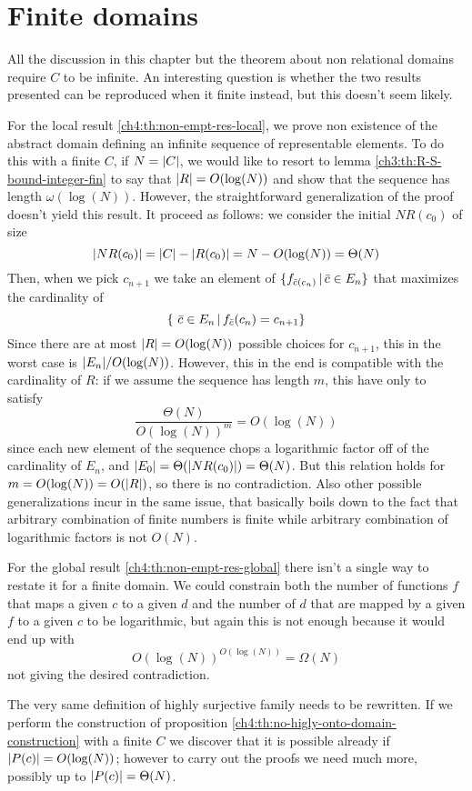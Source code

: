 \section{Finite domains}
All the discussion in this chapter but the theorem about non relational domains require $C$ to be infinite. An interesting question is whether the two results presented can be reproduced when it finite instead, but this doesn't seem likely.

For the local result \ref{ch4:th:non-empt-res-local}, we prove non existence of the abstract domain defining an infinite sequence of representable elements. To do this with a finite $C$, if $N = \lvert C\rvert$, we would like to resort to lemma \ref{ch3:th:R-S-bound-integer-fin} to say that $\lvert R\rvert = O(\log(N))$ and show that the sequence has length $\omega(\log(N))$. However, the straightforward generalization of the proof doesn't yield this result. It proceed as follows: we consider the initial $NR(c_0)$ of size
\[
\lvert NR(c_0)\rvert = \lvert C\rvert - \lvert R(c_0)\rvert = N - O(\log(N)) = \Theta(N)
\]
Then, when we pick $c_{n+1}$ we take an element of $\{ f_{\bar{c}(c_n)} \,\vert\, \bar{c} \in E_n \}$ that maximizes the cardinality of
\[
\{\ \bar{c} \in E_n \,\vert\, f_{\bar{c}}(c_n) = c_{n+1} \}
\]
Since there are at most $\lvert R\rvert = O(\log(N))$ possible choices for $c_{n+1}$, this in the worst case is $\lvert E_n\rvert / O(\log(N))$. However, this in the end is compatible with the cardinality of $R$: if we assume the sequence has length $m$, this have only to satisfy
\[
\frac{\Theta(N)}{O(\log(N))^m} = O(\log(N))
\]
since each new element of the sequence chops a logarithmic factor off of the cardinality of $E_n$, and $\lvert E_0\rvert = \Theta(\lvert NR(c_0)\rvert) = \Theta(N)$. But this relation holds for $m = O(\log(N)) = O(\lvert R\rvert)$, so there is no contradiction.
Also other possible generalizations incur in the same issue, that basically boils down to the fact that arbitrary combination of finite numbers is finite while arbitrary combination of logarithmic factors is not $O(N)$.

For the global result \ref{ch4:th:non-empt-res-global} there isn't a single way to restate it for a finite domain. We could constrain both the number of functions $f$ that maps a given $c$ to a given $d$ and the number of $d$ that are mapped by a given $f$ to a given $c$ to be logarithmic, but again this is not enough because it would end up with
\[
O(\log(N))^{O(\log(N))} = \Omega(N)
\]
not giving the desired contradiction.

The very same definition of highly surjective family needs to be rewritten. If we perform the construction of proposition \ref{ch4:th:no-higly-onto-domain-construction} with a finite $C$ we discover that it is possible already if $\lvert P(c)\rvert = O(\log(N))$; however to carry out the proofs we need much more, possibly up to $\lvert P(c)\rvert = \Theta(N)$.

